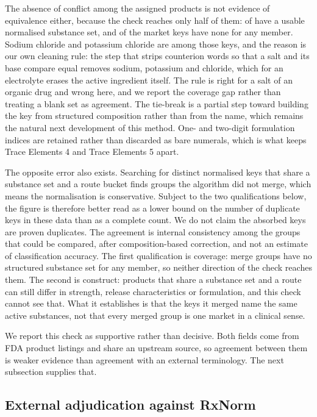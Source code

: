 \documentclass[pdflatex,sn-vancouver-num,Numbered]{sn-jnl}
\begin{document}
The absence of conflict among the assigned products is not evidence of equivalence either,
because the check reaches only half of them: \nNdcAssignedWithSub of \nNdcAssigned have a usable
normalised substance set, and \nNdcKeysNoSub of the \nNdcKeys market keys have none for any
member. Sodium chloride and potassium chloride are among those keys, and the reason is our own
cleaning rule: the step that strips counterion words so that a salt and its base compare equal
removes sodium, potassium and chloride, which for an electrolyte erases the active ingredient
itself. The rule is right for a salt of an organic drug and wrong here, and we report the
coverage gap rather than treating a blank set as agreement.
The tie-break is a partial step toward building the key from structured composition rather than
from the name, which remains the natural next development of this method. One- and two-digit formulation indices are retained rather than
discarded as bare numerals, which is what keeps Trace Elements 4 and Trace Elements 5 apart.

The opposite error also exists. Searching for distinct normalised keys that share a substance
set and a route bucket finds groups the algorithm did not merge, which means the normalisation
is conservative. Subject to the two qualifications below, the \nKeysAbsorbed figure is
therefore better read as a lower bound on the number of duplicate keys in these data than as a
complete count. We do not claim the \nKeysAbsorbed absorbed keys are proven duplicates. The
\nConfirmed agreement is internal consistency among the groups that could be compared, after
composition-based correction, and not an estimate of classification accuracy. The first qualification is coverage: \nUntestable merge groups have no
structured substance set for any member, so neither direction of the check reaches them. The
second is construct: products that share a substance set and a route can still differ in
strength, release characteristics or formulation, and this check cannot see that. What it
establishes is that the keys it merged name the same active substances, not that every merged
group is one market in a clinical sense.

We report this check as supportive rather than decisive. Both fields come from FDA product
listings and share an upstream source, so agreement between them is weaker evidence than
agreement with an external terminology. The next subsection supplies that.

\subsection{External adjudication against RxNorm}\label{subsec:rxnorm}
\end{document}
